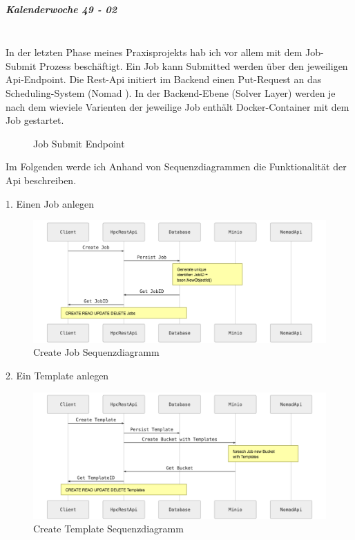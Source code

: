 \documentclass[12pt]{article}
\begin{document}
\subparagraph{Kalenderwoche 49 - 02}\mbox{}\\

In der letzten Phase meines Praxisprojekts hab ich vor allem mit dem Job-Submit Prozess beschäftigt. Ein Job kann Submitted werden über den jeweiligen Api-Endpoint. Die Rest-Api initiert im Backend einen Put-Request an das Scheduling-System (Nomad \cite{NOMAD}). In der Backend-Ebene (Solver Layer) werden je nach dem wieviele Varienten der jeweilige Job enthält Docker-Container mit dem Job gestartet.



\begin{figure}[h!]
\caption{Job Submit Endpoint}
\label{tab:meinetabelle}
\end{figure}

\newpage

Im Folgenden werde ich Anhand von Sequenzdiagrammen die Funktionalität der Api beschreiben.

1. Einen Job anlegen
\begin{figure}[h!]
  \centering

  \includegraphics[width=\textwidth]{images/01_create-job.png}
  \caption{Create Job Sequenzdiagramm}
  \label{}

\end{figure}


2. Ein Template anlegen
\begin{figure}[h!]
  \centering

  \includegraphics[width=\textwidth]{images/02_create-template.png}
  \caption{Create Template Sequenzdiagramm}
  \label{}

\end{figure}
\end{document}
